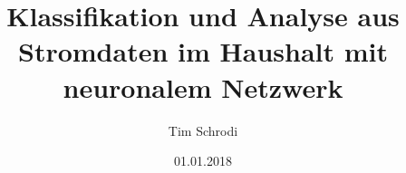 \documentclass[12pt, a4paper]{report}
\begin{document}
\title{Klassifikation und Analyse aus Stromdaten im Haushalt mit neuronalem
Netzwerk}
\author{Tim Schrodi}
\date{01.01.2018}
\maketitle

\tableofcontents











{}

\end{document}
